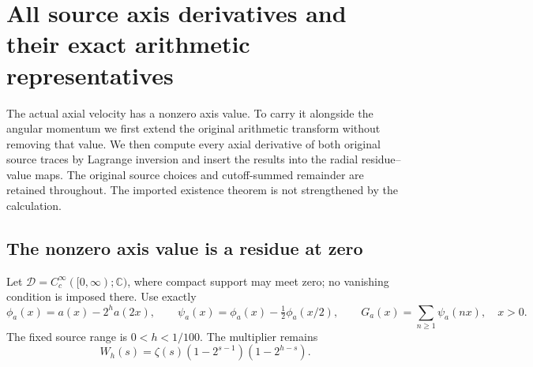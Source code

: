 \section{All source axis derivatives and their exact arithmetic representatives}
\label{sec:ns-all-axis-mellin}

The actual axial velocity has a nonzero axis value. To carry it alongside
the angular momentum we first extend the original arithmetic transform
without removing that value. We then compute every axial derivative of
both original source traces by Lagrange inversion and insert the results
into the radial residue--value maps. The original source choices and
cutoff-summed remainder are retained throughout. The imported existence
theorem is not strengthened by the calculation.

\subsection{The nonzero axis value is a residue at zero}

Let $\mathcal D=C_c^\infty([0,\infty);\mathbb C)$, where compact support
may meet zero; no vanishing condition is imposed there. Use exactly
\[
 \phi_a(x)=a(x)-2^ha(2x),\qquad
 \psi_a(x)=\phi_a(x)-\tfrac12\phi_a(x/2),\qquad
 G_a(x)=\sum_{n\geq1}\psi_a(nx),\quad x>0.
\]
The fixed source range is $0<h<1/100$. The multiplier remains
\[
 W_h(s)=\zeta(s)(1-2^{s-1})(1-2^{h-s}).
\]

